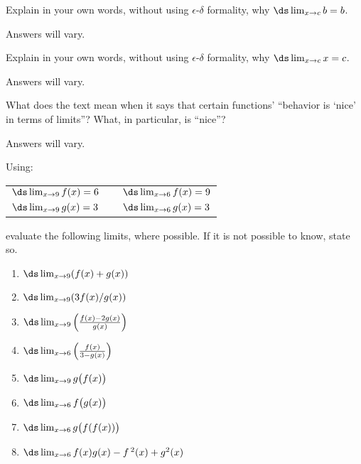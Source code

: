 \begin{enumialphparenastyle}

\begin{ex}
{Explain in your own words, without using $\epsilon$-$\delta$ formality, why $\ds \lim_{x\to c} b = b$.}

\begin{sol}
{Answers will vary.
}
\end{sol}

\end{ex}
\begin{ex}
{Explain in your own words, without using $\epsilon$-$\delta$ formality, why $\ds \lim_{x\to c} x = c$.}

\begin{sol}
{Answers will vary.
}
\end{sol}

\end{ex}
\begin{ex}
{What does the text mean when it says that certain functions' ``behavior is `nice' in terms of limits''? What, in particular, is ``nice''?}

\begin{sol}
{Answers will vary.
}
\end{sol}

\end{ex}

\begin{ex}
Using:

\begin{tabular}{lll}
$\ds \lim_{x\to9}f(x) = 6$ & \quad\quad &$\ds \lim_{x\to6} f(x) = 9$\\
$\ds \lim_{x\to9}g(x) = 3$ &  & $\ds \lim_{x\to6} g(x) = 3$
\end{tabular}

\noindent evaluate the following limits, where possible. If it is not possible to know, state so.
\begin{enumerate}
\item {$\ds \lim_{x\to9}(f(x)+g(x))$}
\item  {$\ds \lim_{x\to9}(3f(x)/g(x))$}
\item {$\ds \lim_{x\to9}\left(\frac{f(x)-2g(x)}{g(x)}\right)$}
\item {$\ds \lim_{x\to6}\left(\frac{f(x)}{3-g(x)}\right)$}
\item  {$\ds \lim_{x\to9}g\big(f(x)\big)$} 
\item {$\ds \lim_{x\to6}f\big(g(x)\big)$}
\item {$\ds \lim_{x\to6}g\big(f(f(x))\big)$}
\item {$\ds \lim_{x\to6}f(x)g(x)-f\,^2(x)+g^2(x)$}
\end{enumerate}


\end{ex}
\end{enumialphparenastyle}
